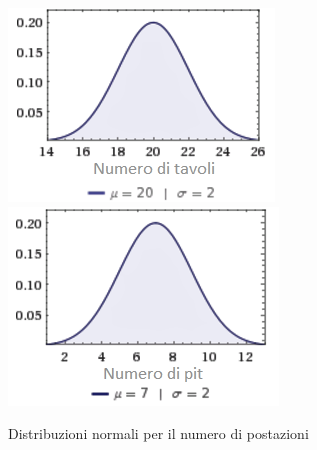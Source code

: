     \begin{figure}[!htb]
    \begin{widepage}
    \centering
    \includegraphics[width=.49\textwidth]{../immagini/gauss_tavoli_w.png}\hfil
    \includegraphics[width=.49\textwidth]{../immagini/gauss_pit_w.png}
    \caption{Distribuzioni normali per il numero di postazioni}
    \end{widepage}
    \end{figure}
\clearpage
